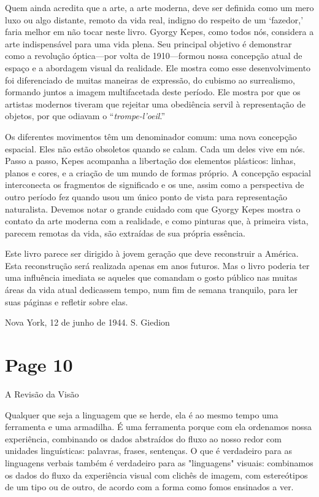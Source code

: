 \documentclass[a4paper]{article}
\begin{document}
Quem ainda acredita que a arte, a arte moderna, deve ser definida como um mero luxo ou algo distante, remoto da vida real, indigno do respeito de um \textquoteleft fazedor,\textquoteright\, faria melhor em não tocar neste livro. Gyorgy Kepes, como todos nós, considera a arte indispensável para uma vida plena. Seu principal objetivo é demonstrar como a revolução óptica---por volta de 1910---formou nossa concepção atual de espaço e a abordagem visual da realidade. Ele mostra como esse desenvolvimento foi diferenciado de muitas maneiras de expressão, do cubismo ao surrealismo, formando juntos a imagem multifacetada deste período. Ele mostra por que os artistas modernos tiveram que rejeitar uma obediência servil à representação de objetos, por que odiavam o ``\textit{trompe-l'oeil}.''

Os diferentes movimentos têm um denominador comum: uma nova concepção espacial. Eles não estão obsoletos quando se calam. Cada um deles vive em nós. Passo a passo, Kepes acompanha a libertação dos elementos plásticos: linhas, planos e cores, e a criação de um mundo de formas próprio. A concepção espacial interconecta os fragmentos de significado e os une, assim como a perspectiva de outro período fez quando usou um único ponto de vista para representação naturalista. Devemos notar o grande cuidado com que Gyorgy Kepes mostra o contato da arte moderna com a realidade, e como pinturas que, à primeira vista, parecem remotas da vida, são extraídas de sua própria essência.

Este livro parece ser dirigido à jovem geração que deve reconstruir a América. Esta reconstrução será realizada apenas em anos futuros. Mas o livro poderia ter uma influência imediata se aqueles que comandam o gosto público nas muitas áreas da vida atual dedicassem tempo, num fim de semana tranquilo, para ler suas páginas e refletir sobre elas.

Nova York, 12 de junho de 1944. \hfill S. Giedion

\newpage
\section*{Page 10}

\centering
\large A Revisão da Visão
\par
\vspace{1em}

Qualquer que seja a linguagem que se herde, ela é ao mesmo tempo uma ferramenta e uma armadilha. É uma ferramenta porque com ela ordenamos nossa experiência, combinando os dados abstraídos do fluxo ao nosso redor com unidades linguísticas: palavras, frases, sentenças. O que é verdadeiro para as linguagens verbais também é verdadeiro para as "linguagens" visuais: combinamos os dados do fluxo da experiência visual com clichês de imagem, com estereótipos de um tipo ou de outro, de acordo com a forma como fomos ensinados a ver.
\end{document}
